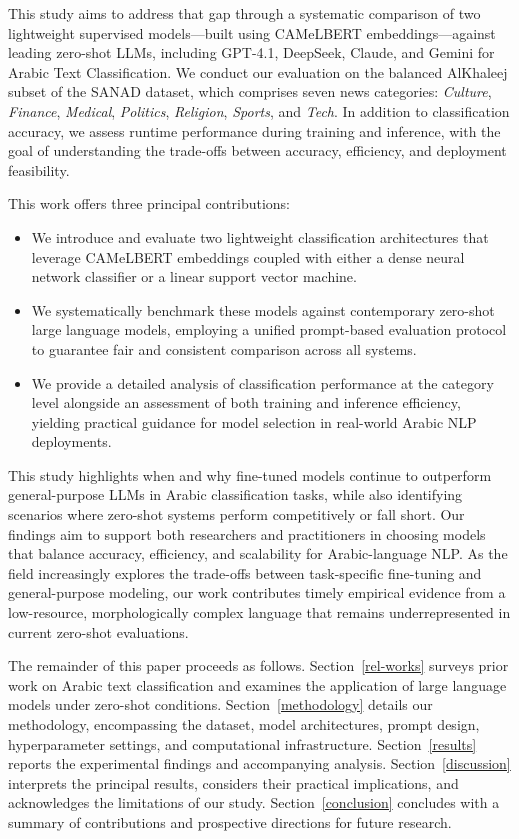 \documentclass[sn-mathphys-num]{sn-jnl}
\begin{document}
This study aims to address that gap through a systematic comparison of two lightweight supervised models—built using CAMeLBERT embeddings—against leading zero-shot LLMs, including GPT-4.1, DeepSeek, Claude, and Gemini for Arabic Text Classification. We conduct our evaluation on the balanced AlKhaleej subset of the SANAD dataset, which comprises seven news categories: \textit{Culture}, \textit{Finance}, \textit{Medical}, \textit{Politics}, \textit{Religion}, \textit{Sports}, and \textit{Tech}. In addition to classification accuracy, we assess runtime performance during training and inference, with the goal of understanding the trade-offs between accuracy, efficiency, and deployment feasibility.

This work offers three principal contributions:
\begin{itemize}
    \item We introduce and evaluate two lightweight classification architectures that leverage CAMeLBERT embeddings coupled with either a dense neural network classifier or a linear support vector machine.
    \item We systematically benchmark these models against contemporary zero-shot large language models, employing a unified prompt-based evaluation protocol to guarantee fair and consistent comparison across all systems.
    \item We provide a detailed analysis of classification performance at the category level alongside an assessment of both training and inference efficiency, yielding practical guidance for model selection in real-world Arabic NLP deployments.
\end{itemize}

This study highlights when and why fine-tuned models continue to outperform general-purpose LLMs in Arabic classification tasks, while also identifying scenarios where zero-shot systems perform competitively or fall short. Our findings aim to support both researchers and practitioners in choosing models that balance accuracy, efficiency, and scalability for Arabic-language NLP.
As the field increasingly explores the trade-offs between task-specific fine-tuning and general-purpose modeling, our work contributes timely empirical evidence from a low-resource, morphologically complex language that remains underrepresented in current zero-shot evaluations.

The remainder of this paper proceeds as follows. Section~\ref{rel-works} surveys prior work on Arabic text classification and examines the application of large language models under zero-shot conditions. Section~\ref{methodology} details our methodology, encompassing the dataset, model architectures, prompt design, hyperparameter settings, and computational infrastructure. Section~\ref{results} reports the experimental findings and accompanying analysis. Section~\ref{discussion} interprets the principal results, considers their practical implications, and acknowledges the limitations of our study. Section~\ref{conclusion} concludes with a summary of contributions and prospective directions for future research.
\end{document}
